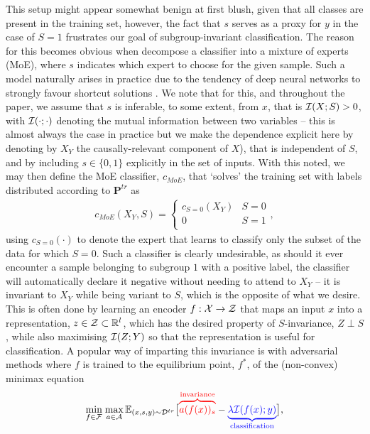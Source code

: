 %
This setup might appear somewhat benign at first blush, given that all classes are present in the
training set, however, the fact that \(s\) serves as a proxy for \(y\) in the case of $S=1$
frustrates our goal of subgroup-invariant classification. 
%
The reason for this becomes obvious when decompose a classifier into a mixture of experts (MoE),
where \(s\) indicates which expert to choose for the given sample. 
%
Such a model naturally arises in practice due to the tendency of deep neural networks to strongly
favour shortcut solutions \citep{geirhos2020shortcut}.
%
We note that for this, and throughout the paper, we assume that \(s\) is inferable, to some extent,
from $x$, that is \( {\mathcal{I}}(X; S) > 0 \), with \( {\mathcal{I}}(\cdot; \cdot) \) denoting the mutual information
between two variables -- this is almost always the case in practice but we make the dependence
explicit here by denoting by \( X_Y \) the causally-relevant component of \( X \)), that is
independent of \(S\), and by including \( s \in \{0, 1\} \) explicitly in the set of inputs.
%
With this noted, we may then define the MoE classifier, \(c_{MoE}\), that `solves' the training set
with labels distributed according to \( \mathbf{P}^{tr} \) as
%
\begin{align}
  c_{MoE}(X_Y, S) = \begin{cases}
c_{S=0}(X_Y) &S=0 \\
0 &S=1 \\
\end{cases},
\end{align}
%
using \(c_{S=0}(\cdot)\) to denote the expert that learns to classify only the subset of the data
for which $S=0$.
%
Such a classifier is clearly undesirable, as should it ever encounter a sample belonging to
subgroup $1$ with a positive label, the classifier will automatically declare it negative without
needing to attend to $X_Y$ -- it is invariant to $X_Y$ while being variant to \(S\), which is the
opposite of what we desire. 
%
This is often done by learning an encoder $f: {\mathcal{X}} \to {\mathcal{Z}}$ that maps an input $x$ into a
representation, \( z \in {\mathcal{Z}} \subset \mathbb{R}^l \), which has the desired property of \(S\)-invariance,
\( Z \perp S \), while also maximising ${\mathcal{I}}(Z; Y)$ so that the representation is useful for
classification. 
%
A popular way of imparting this invariance is with adversarial methods \cite{ganin2016domain,
zhao2018adversarial, madras2018learning} where  $f$ is trained to the equilibrium point, $f^\ast$,
of the (non-convex) minimax equation 
%
\begin{align}\label{eq:moo}
\underset{f \in {\mathcal{F}}}{\text{min}}\; \underset{a \in {\mathcal{A}}}{\text{max}}\,
\mathbb{E}_{(x, s, y) \sim {\mathcal{D}}^{tr}}
\big[ 
  \textcolor{red}{ \overbrace{ a(f(x))_s }^{ \text{invariance}} }
  - \textcolor{blue}{ \underbrace{ \lambda {\mathcal{I}}(f(x); y) }_{ \text{classification} } }
\big],
\end{align}
